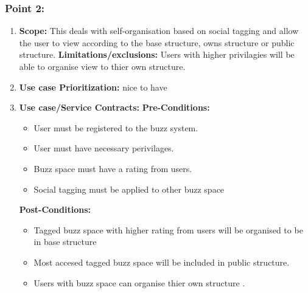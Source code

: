 \documentclass[11pt]{article}
\begin{document}
\subsubsection{Point 2:} 
\begin{enumerate}
\item 
\textbf{Scope:}
This deals with  self-organisation based on social tagging and allow the user to view according to the base structure, owns structure or public structure.
\newline
\textbf{Limitations/exclusions:} 
Users with higher privilagies will be able to organise view to thier own structure.
\item 
\textbf{Use case Prioritization:} nice to have

\item 
\textbf{Use case/Service Contracts:} 
\newline
\textbf{Pre-Conditions: }
\begin{itemize}
\item User must be registered to the buzz system.
\item User must have necessary perivilages.
\item Buzz space must have a rating from users.
\item Social tagging must be applied to other buzz space
\end{itemize}
 

\textbf{Post-Conditions: }
\begin{itemize}
\item Tagged buzz space with higher rating from users will be organised to be in base structure
\item Most accesed tagged buzz space will be included in public structure.
\item Users with buzz space can organise thier own structure .
\end{itemize}
\end{enumerate}
\end{document}
